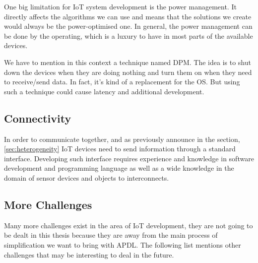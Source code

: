 One big limitation for \gls{IoT} system development is the power management. It
directly affects the algorithms we can use and means that the solutions we
create would always be the power-optimised one. \cite{Sneps-Sneppe2016} In
general, the power management can be done by the operating, which is a luxury
to have in most parts of the available devices.

We have to mention in this context a technique named \gls{DPM}. The idea is to
shut down the devices when they are doing nothing and turn them on when they
need to receive/send data. In fact, it’s kind of a replacement for the
\gls{OS}. But using such a technique could cause latency and additional development.

\subsection{Connectivity}
\label{sec:connectivity}

In order to communicate together, and as previously announce in the section,
\ref{sec:heterogeneity} \gls{IoT} devices need to send information through
a standard interface. Developing such interface requires experience and knowledge
in software development and programming language as well as a wide knowledge in
the domain of sensor devices and objects to interconnects. \cite{midgar}

\subsection{More Challenges}
\label{sec:more_challenges}

Many more challenges exist in the area of \gls{IoT} development, they are not
going to be dealt in this thesis because they are away from the main process
of simplification we want to bring with \gls{APDL}. The following list mentions
other challenges that may be interesting to deal in the future. 


